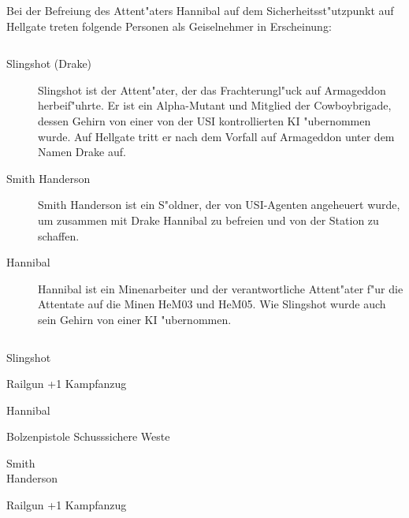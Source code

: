 \newpage
{}

Bei der Befreiung des Attent"aters Hannibal auf dem Sicherheitsst"utzpunkt auf Hellgate treten folgende Personen als Geiselnehmer in Erscheinung:

\begin{column}[l]{0.45}
    \begin{description}
        \item[Slingshot (Drake)] Slingshot ist der Attent"ater, der das Frachterungl"uck auf Armageddon herbeif"uhrte. Er ist ein 
            Alpha-Mutant und Mitglied der Cowboybrigade, dessen Gehirn von einer von der USI kontrollierten KI "ubernommen wurde. Auf Hellgate tritt er nach dem Vorfall auf Armageddon unter dem Namen Drake auf.
        \item[Smith Handerson] Smith Handerson ist ein S"oldner, der von USI-Agenten angeheuert wurde, um zusammen mit Drake Hannibal zu 
            befreien und von der Station zu schaffen.
        \item[Hannibal] Hannibal ist ein Minenarbeiter und der verantwortliche Attent"ater f"ur die Attentate auf die Minen HeM03 und 
            HeM05. Wie Slingshot wurde auch sein Gehirn von einer KI "ubernommen.
    \end{description}
\end{column}
\begin{column}[r]{0.45}
    \begin{nscsheet}[h]{Slingshot}
        \nscstats[ATT=1,AGG=2,DEX=3]
        \nscruler
        \begin{nscinventory}
            \nscitem[Waffen] Railgun +1
            \nscitem[R"ustung] Kampfanzug
        \end{nscinventory}
    \end{nscsheet}    

    \begin{nscsheet}[h]{Hannibal}
        \nscstats[ATT=1,AGG=2,DEX=3,COM=2,CON=2]
        \nscruler
        \begin{nscinventory}
            \nscitem[Waffen] Bolzenpistole
            \nscitem[R"ustung] Schusssichere Weste
        \end{nscinventory}
    \end{nscsheet} 

    \begin{nscsheet}[h]{Smith\\ Handerson}
        \nscstats[ATT=3,AGG=2]
        \nscruler
        \begin{nscinventory}
            \nscitem[Waffen] Railgun +1
            \nscitem[R"ustung] Kampfanzug
        \end{nscinventory}
    \end{nscsheet}
\end{column}

\newpage
